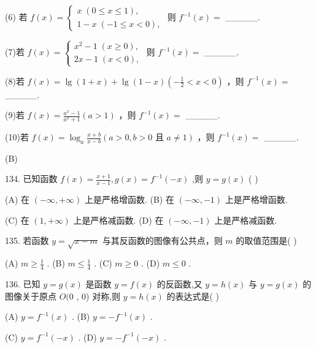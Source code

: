\documentclass[10pt]{article}
\begin{document}
(6) 若 \(f\left( x\right)  = \left\{  \begin{array}{l} x\;\left( {0 \leq  x \leq  1}\right) , \\  1 - x\;\left( {-1 \leq  x < 0}\right) , \end{array}\right.\) 则 \({f}^{-1}\left( x\right)  =\) \_\_\_\_\_.

(7)若 \(f\left( x\right)  = \left\{  \begin{array}{l} {x}^{2} - 1\;\left( {x \geq  0}\right) , \\  {2x} - 1\;\left( {x < 0}\right) , \end{array}\right.\) 则 \({f}^{-1}\left( x\right)  =\) \_\_\_\_\_.

(8)若 \(f\left( x\right)  = \lg \left( {1 + x}\right)  + \lg \left( {1 - x}\right) \left( {-\frac{1}{2} < x < 0}\right)\) ，则 \({f}^{-1}\left( x\right)  =\) \_\_\_\_\_.

(9)若 \(f\left( x\right)  = \frac{{a}^{x} - 1}{{a}^{x} + 1}\left( {a > 1}\right)\) ，则 \({f}^{-1}\left( x\right)  =\) \_\_\_\_\_.

(10)若 \(f\left( x\right)  = {\log }_{a}\frac{x + b}{x - b}\left( {a > 0,b > 0\text{ 且 }a \neq  1}\right)\) ，则 \({f}^{-1}\left( x\right)  =\) \_\_\_\_\_.

(B)

134. 已知函数 \(f\left( x\right)  = \frac{x + 1}{x - 1},g\left( x\right)  = {f}^{-1}\left( {-x}\right)\) ,则 \(y = g\left( x\right)\) (   )

(A) 在 \(\left( {-\infty , + \infty }\right)\) 上是严格增函数. (B) 在 \(\left( {-\infty , - 1}\right)\) 上是严格增函数.

(C) 在 \(\left( {1, + \infty }\right)\) 上是严格减函数. (D) 在 \(\left( {-\infty , - 1}\right)\) 上是严格减函数.

135. 若函数 \(y = \sqrt{x - m}\) 与其反函数的图像有公共点，则 \(m\) 的取值范围是( )

(A) \(m \geq  \frac{1}{4}\) . (B) \(m \leq  \frac{1}{4}\) . (C) \(m \geq  0\) . (D) \(m \leq  0\) .

136. 已知 \(y = g\left( x\right)\) 是函数 \(y = f\left( x\right)\) 的反函数,又 \(y = h\left( x\right)\) 与 \(y = g\left( x\right)\) 的图像关于原点 \(O(0\) , 0) 对称,则 \(y = h\left( x\right)\) 的表达式是(   )

(A) \(y = {f}^{-1}\left( x\right)\) . (B) \(y =  - {f}^{-1}\left( x\right)\) .

(C) \(y = {f}^{-1}\left( {-x}\right)\) . (D) \(y =  - {f}^{-1}\left( {-x}\right)\) .
\end{document}
